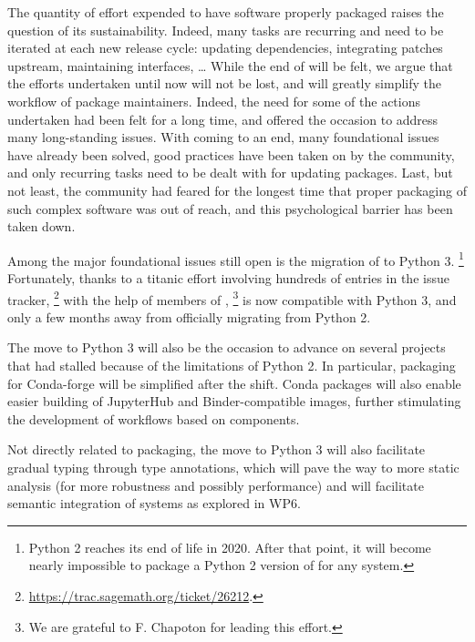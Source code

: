 \documentclass{deliverablereport}
\begin{document}
The quantity of effort expended to have software properly packaged raises
the question of its sustainability. %
Indeed, many tasks are recurring and need to be iterated at each new
release cycle: updating dependencies, integrating patches upstream,
maintaining interfaces, \dots %
While the end of \ODK will be felt, we argue that the efforts undertaken
until now will not be lost, and will greatly simplify the workflow of
package maintainers.  %
Indeed, the need for some of the actions undertaken had been felt for
a long time, and \ODK offered the occasion to address many
long-standing issues. %
With \ODK coming to an end, many foundational issues have already been
solved, good practices have been taken on by the community, and only recurring tasks need to be dealt with for updating
packages. Last, but not least, the community had feared for the
longest time that proper packaging of such complex software was out of
reach, and this psychological barrier has been taken down.

Among the major foundational issues still open is the migration of
\Sage to Python 3.%
\footnote{Python 2 reaches its end of life in 2020. After that point,
  it will become nearly impossible to package a Python 2 version of
  \Sage for any system.} %
Fortunately, thanks to a titanic effort involving hundreds of entries
in the issue tracker,%
\footnote{\url{https://trac.sagemath.org/ticket/26212}.}  with the
help of members of \ODK,%
\footnote{We are grateful to F. Chapoton for leading this effort.}
\Sage is now compatible with Python 3, and only a few months away from
officially migrating from Python 2.

The move to Python 3 will also be the occasion to advance on several
projects that had stalled because of the limitations of Python 2. %
In particular, packaging for Conda-forge will be simplified after the
shift.%
Conda packages will also enable easier building of JupyterHub and
Binder-compatible images, further stimulating the development of
workflows based on \ODK components.

Not directly related to packaging, the move to Python 3 will also
facilitate gradual typing through type annotations, which will pave
the way to more static analysis (for more robustness and possibly
performance) and will facilitate semantic integration of systems as
explored in WP6.
\end{document}
